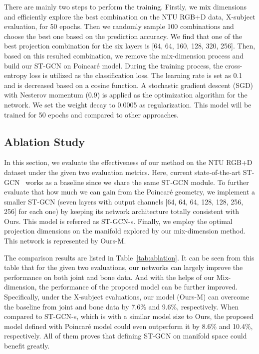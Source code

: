 \documentclass[letterpaper]{article} \usepackage{aaai19}  \usepackage{times}  \usepackage{helvet} \usepackage{courier}  \usepackage[hyphens]{url}  \usepackage{graphicx} \urlstyle{rm} \def\UrlFont{\rm}  \usepackage{graphicx}  \frenchspacing  \setlength{\pdfpagewidth}{8.5in}  \setlength{\pdfpageheight}{11in}
\begin{document}
There are mainly two steps to perform the training. Firstly, we mix dimensions and efficiently explore the best combination on the NTU RGB+D data, X-subject evaluation, for 50 epochs. Then we randomly sample 100 combinations and choose the best one based on the prediction accuracy. We find that one of the best projection combination for the six layers is [64, 64, 160, 128, 320, 256]. Then, based on this resulted combination, we remove the mix-dimension process and build our ST-GCN on Poincar\'e model. During the training process, the cross-entropy loss is utilized as the classification loss. The learning rate is set as 0.1 and is decreased based on a cosine function. A stochastic gradient descent (SGD) with Nesterov momentum (0.9) is applied as the optimization algorithm for the network. We set the weight decay to 0.0005 as regularization. This model will be trained for 50 epochs and compared to other approaches.  


\subsection{Ablation Study}
In this section, we evaluate the effectiveness of our method on the NTU RGB+D dataset under the given two evaluation metrics. Here, current state-of-the-art ST-GCN~\cite{yan2018stgan} works as a baseline since we share the same ST-GCN module. To further evaluate that how much we can gain from the Poincar\'e geometry,  we implement a smaller ST-GCN (seven layers with output channels [64, 64, 64, 128, 128, 256, 256] for each one) by keeping its network architecture totally consistent with Ours. This model is referred as ST-GCN-s. Finally, we employ the optimal projection dimensions on the manifold explored by our mix-dimension method. This network is represented by Ours-M.

The comparison results are listed in Table~\ref{tab:ablation}. It can be seen from this table that for the given two evaluations, our networks can largely improve the performance on both joint and bone data. And with the helps of our Mix-dimension, the performance of the proposed model can be further improved. Specifically, under the X-subject evaluations, our model (Ours-M) can overcome the baseline from joint and bone data by 7.6\% and 9.6\%, respectively. When compared to ST-GCN-s, which is with a similar model size to Ours, the proposed model defined with Poincar\'e model could even outperform it by 8.6\% and 10.4\%, respectively. All of them proves that defining ST-GCN on manifold space could benefit greatly. 
\end{document}
